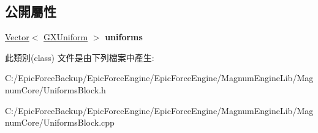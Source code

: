 \subsection*{公開屬性}
\begin{DoxyCompactItemize}
\item 
\hyperlink{class_magnum_1_1_vector}{Vector}$<$ \hyperlink{class_magnum_1_1_g_x_uniform}{G\+X\+Uniform} $>$ {\bfseries uniforms}\hypertarget{class_magnum_1_1_uniforms_block_a199bebca608bad490497446ad5b6c26d}{}\label{class_magnum_1_1_uniforms_block_a199bebca608bad490497446ad5b6c26d}

\end{DoxyCompactItemize}


此類別(class) 文件是由下列檔案中產生\+:\begin{DoxyCompactItemize}
\item 
C\+:/\+Epic\+Force\+Backup/\+Epic\+Force\+Engine/\+Epic\+Force\+Engine/\+Magnum\+Engine\+Lib/\+Magnum\+Core/Uniforms\+Block.\+h\item 
C\+:/\+Epic\+Force\+Backup/\+Epic\+Force\+Engine/\+Epic\+Force\+Engine/\+Magnum\+Engine\+Lib/\+Magnum\+Core/Uniforms\+Block.\+cpp\end{DoxyCompactItemize}
